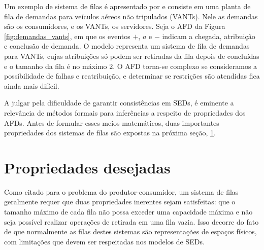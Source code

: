 Um exemplo de sistema de filas é apresentado por  e consiste em uma planta de fila de demandas para veículos aéreos não tripulados (\acs{VANT}s). Nele as demandas são os consumidores, e os VANTs, os servidores. Seja o AFD da Figura \ref{fig:demandas_vants}, em que os eventos $+$, $a$ e $-$ indicam a chegada, atribuição e conclusão de demanda. O modelo representa um sistema de fila de demandas para VANTs, cujas atribuições só podem ser retiradas da fila depois de concluídas e o tamanho da fila é no máximo $2$. O AFD torna-se complexo se consideramos a possibilidade de falhas e reatribuição, e determinar se restrições são atendidas fica ainda mais difícil.


A julgar pela dificuldade de garantir consistências em SEDs, é eminente a relevância de métodos formais para inferências a respeito de propriedades dos AFDs. Antes de formular esses meios matemáticos, duas importantes propriedades dos sistemas de filas são expostas na próxima seção, \ref{sec:props}.

\section{Propriedades desejadas}
\label{sec:props}

Como citado para o problema do produtor-consumidor, um sistema de filas geralmente requer que duas propriedades inerentes sejam satisfeitas: que o tamanho máximo de cada fila não possa exceder uma capacidade máxima e não seja possível realizar operações de retirada em uma fila vazia. Isso decorre do fato de que normalmente as filas destes sistemas são representações de espaços físicos, com limitações que devem ser respeitadas nos modelos de SEDs.

